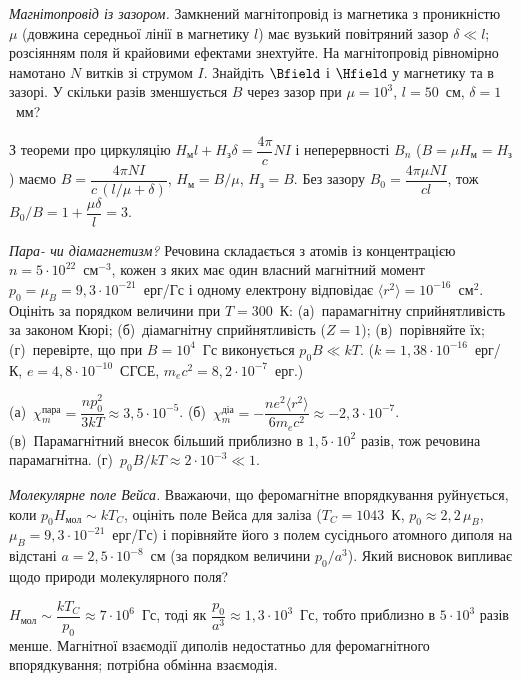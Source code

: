 \begin{problem}\label{prb:MagneticCircuitGap}
	\emph{Магнітопровід із зазором.} Замкнений магнітопровід із магнетика з проникністю $\mu$ (довжина середньої лінії в магнетику $l$) має вузький повітряний зазор $\delta\ll l$; розсіянням поля й крайовими ефектами знехтуйте. На магнітопровід рівномірно намотано $N$ витків зі струмом $I$. Знайдіть $\Bfield$ і $\Hfield$ у магнетику та в зазорі. У скільки разів зменшується $B$ через зазор при $\mu=10^3$, $l=50$~см, $\delta=1$~мм?
	\begin{solution}
		З теореми про циркуляцію $H_\text{м}l+H_\text{з}\delta=\dfrac{4\pi}{c}NI$ і неперервності $B_n$ ($B=\mu H_\text{м}=H_\text{з}$) маємо $B=\dfrac{4\pi NI}{c\,(l/\mu+\delta)}$, $H_\text{м}=B/\mu$, $H_\text{з}=B$. Без зазору $B_0=\dfrac{4\pi\mu NI}{cl}$, тож $B_0/B=1+\dfrac{\mu\delta}{l}=3$.
	\end{solution}
\end{problem}

\begin{problem}\label{prb:ParaVsDia}
	\emph{Пара- чи діамагнетизм?} Речовина складається з атомів із концентрацією $n=5\cdot10^{22}$~см$^{-3}$, кожен з яких має один власний магнітний момент $p_0=\mu_B=9{,}3\cdot10^{-21}$~ерг/Гс і одному електрону відповідає $\langle r^2\rangle=10^{-16}$~см$^2$. Оцініть за порядком величини при $T=300$~К: (а)~парамагнітну сприйнятливість за законом Кюрі; (б)~діамагнітну сприйнятливість ($Z=1$); (в)~порівняйте їх; (г)~перевірте, що при $B=10^4$~Гс виконується $p_0B\ll kT$. ($k=1{,}38\cdot10^{-16}$~ерг/К, $e=4{,}8\cdot10^{-10}$~СГСЕ, $m_ec^2=8{,}2\cdot10^{-7}$~ерг.)
	\begin{solution}
		(а)~$\chi_m^{\text{пара}}=\dfrac{np_0^2}{3kT}\approx3{,}5\cdot10^{-5}$. (б)~$\chi_m^{\text{діа}}=-\dfrac{ne^2\langle r^2\rangle}{6m_ec^2}\approx-2{,}3\cdot10^{-7}$. (в)~Парамагнітний внесок більший приблизно в $1{,}5\cdot10^{2}$ разів, тож речовина парамагнітна. (г)~$p_0B/kT\approx2\cdot10^{-3}\ll1$.
	\end{solution}
\end{problem}

\begin{problem}\label{prb:WeissField}
	\emph{Молекулярне поле Вейса.} Вважаючи, що феромагнітне впорядкування руйнується, коли $p_0H_\text{мол}\sim kT_C$, оцініть поле Вейса для заліза ($T_C=1043$~К, $p_0\approx2{,}2\,\mu_B$, $\mu_B=9{,}3\cdot10^{-21}$~ерг/Гс) і порівняйте його з полем сусіднього атомного диполя на відстані $a=2{,}5\cdot10^{-8}$~см (за порядком величини $p_0/a^3$). Який висновок випливає щодо природи молекулярного поля?
	\begin{solution}
		$H_\text{мол}\sim\dfrac{kT_C}{p_0}\approx7\cdot10^{6}$~Гс, тоді як $\dfrac{p_0}{a^3}\approx1{,}3\cdot10^{3}$~Гс, тобто приблизно в $5\cdot10^{3}$ разів менше. Магнітної взаємодії диполів недостатньо для феромагнітного впорядкування; потрібна обмінна взаємодія.
	\end{solution}
\end{problem}

